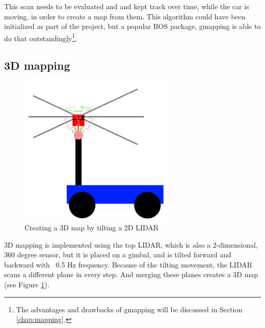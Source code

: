 This scan needs to be evaluated and and kept track over time, while the car is moving, in order to create a map from them. This algorithm could have been initialized as part of the project, but a popular ROS package, gmapping \cite{ros_gmapping} is able to do that outstandingly\footnote{The advantages and drawbacks of gmapping will be discussed in Section \ref{chap:mapping}.}.

\subsection{3D mapping}

\begin{figure}[!ht]
	\centering
	\includegraphics[height=72mm]{figures/raw/3D_lidar.png}
	\caption{Creating a 3D map by tilting a 2D LIDAR}
	\label{tilt_lidar}
\end{figure}

3D mapping is implemented using the top LIDAR, which is also a 2-dimensional, 360 degree sensor, but it is placed on a gimbal, and is tilted forward and backward with ~0.5 Hz frequency. Because of the tilting movement, the LIDAR scans a different plane in every step. And merging these planes creates a 3D map (see Figure \ref{tilt_lidar}).

